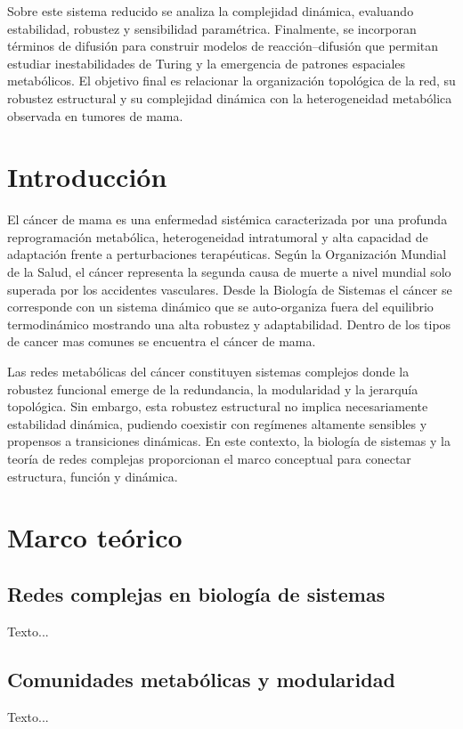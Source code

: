 \documentclass[12pt,spanish]{report}
\begin{document}
	Sobre este sistema reducido se analiza la complejidad dinámica, evaluando estabilidad, robustez y sensibilidad paramétrica. Finalmente, se incorporan términos de difusión para construir modelos de reacción--difusión que permitan estudiar inestabilidades de Turing y la emergencia de patrones espaciales metabólicos. El objetivo final es relacionar la organización topológica de la red, su robustez estructural y su complejidad dinámica con la heterogeneidad metabólica observada en tumores de mama.
	\chapter{Introducción}
	El cáncer de mama es una enfermedad sistémica caracterizada por una profunda reprogramación metabólica, heterogeneidad intratumoral y alta capacidad de adaptación frente a perturbaciones terapéuticas. Según la Organización Mundial de la Salud, el cáncer representa la segunda causa de muerte a nivel mundial solo superada por los accidentes vasculares. Desde la Biología de Sistemas el cáncer se corresponde con un sistema dinámico que se auto-organiza fuera del equilibrio termodinámico mostrando una alta robustez y adaptabilidad. Dentro de los tipos de cancer mas comunes se encuentra el cáncer de mama.
	
	Las redes metabólicas del cáncer constituyen sistemas complejos donde la robustez funcional emerge de la redundancia, la modularidad y la jerarquía topológica. Sin embargo, esta robustez estructural no implica necesariamente estabilidad dinámica, pudiendo coexistir con regímenes altamente sensibles y propensos a transiciones dinámicas. En este contexto, la biología de sistemas y la teoría de redes complejas proporcionan el marco conceptual para conectar estructura, función y dinámica.
	\chapter{Marco teórico}
	\section{Redes complejas en biología de sistemas}
	Texto...
	
	\section{Comunidades metabólicas y modularidad}
	Texto...
	
\end{document}
